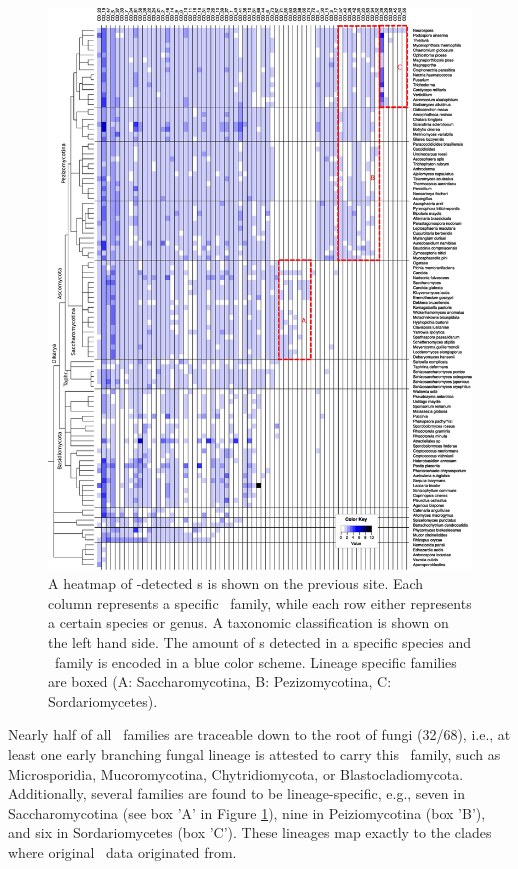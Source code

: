 \begin{figure}
  \centering
  \includegraphics[width=1.05\textwidth]{pics/CD_snoRNAs_collapsed.eps}
  \caption{A heatmap of
    \snostrip-detected \cd s is shown on the previous site. Each column represents a specific \sno\
    family, while each row either represents a certain species or
    genus. A taxonomic classification is shown on the left hand side. The amount of
    \sno s detected in a specific species and \sno\ family is encoded in a
    blue color scheme. Lineage specific families are boxed (A:
    Saccharomycotina, B: Pezizomycotina, C: Sordariomycetes). %
  }
  \label{fig:heatmap_CD_snoRNAs} 
\end{figure}



Nearly half of all \cd\
families are traceable down to the root of fungi (32/68), i.e., at least one early
branching fungal lineage is attested to carry this \sno\
family, such as Microsporidia, Mucoromycotina, Chytridiomycota, or
Blastocladiomycota. Additionally, several families are found to be
lineage-specific, e.g., seven in Saccharomycotina (see box 'A' in
Figure \ref{fig:heatmap_CD_snoRNAs}), nine in Peiziomycotina (box
'B'), and six in Sordariomycetes (box 'C'). These lineages map exactly to the
clades where original \sno\ data originated from.

